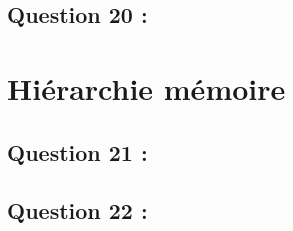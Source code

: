 \documentclass[11pt,a4paper]{article}
\begin{document}
	\subsection{Question 20 :}

	\section{Hiérarchie mémoire}
	\subsection{Question 21 :}

	\subsection{Question 22 :}
	
\end{document}
